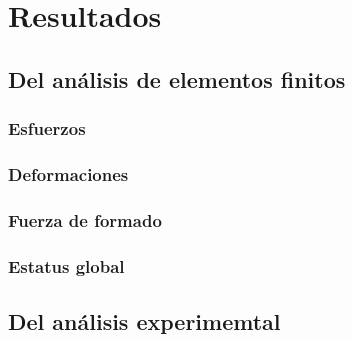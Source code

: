 \chapter{Resultados}

\section{Del análisis de elementos finitos}

\subsection{Esfuerzos}

\subsection{Deformaciones}

\subsection{Fuerza de formado}

\subsection{Estatus global}



\section{Del análisis experimemtal}


